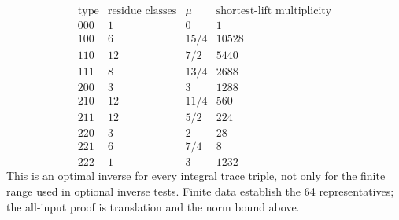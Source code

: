 \documentclass[11pt,reqno]{amsart}
\theoremstyle{definition}\newtheorem{definition}[theorem]{Definition}
\theoremstyle{remark}\newtheorem{remark}[theorem]{Remark}
\begin{document}
\[
\begin{array}{c|r|r|r}
\text{type}&\text{residue classes}&\mu&\text{shortest-lift multiplicity}\\\hline
000&1&0&1\\
100&6&15/4&10528\\
110&12&7/2&5440\\
111&8&13/4&2688\\
200&3&3&1288\\
210&12&11/4&560\\
211&12&5/2&224\\
220&3&2&28\\
221&6&7/4&8\\
222&1&3&1232
\end{array}
\]
This is an optimal inverse for every integral trace triple, not only for the finite range used in optional inverse tests. Finite data establish the 64 representatives; the all-input proof is translation and the norm bound above.
\end{document}

